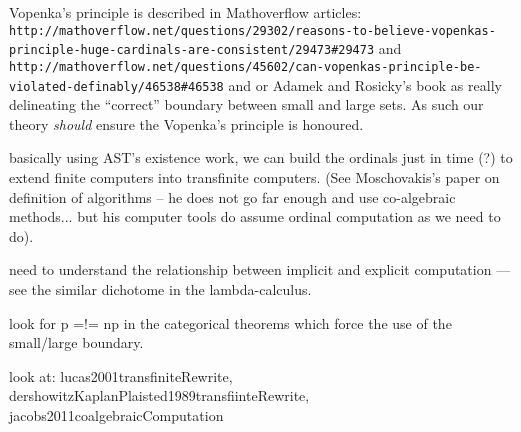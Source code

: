 \documentclass[a4paper,openany]{amsbook}
\begin{document}
Vopenka's principle is described in Mathoverflow articles:
\verb|http://mathoverflow.net/questions/29302/reasons-to-believe-vopenkas-principle-huge-cardinals-are-consistent/29473#29473|
and
\verb|http://mathoverflow.net/questions/45602/can-vopenkas-principle-be-violated-definably/46538#46538|
and or Adamek and Rosicky's book as really delineating the ``correct'' boundary
between small and large sets. As such our theory \emph{should} ensure the
Vopenka's principle is honoured.

basically using AST's existence work, we can build the ordinals just in time (?)
to extend finite computers into transfinite computers. (See Moschovakis's paper
on definition of algorithms -- he does not go far enough and use co-algebraic
methods... but his computer tools do assume ordinal computation as we need to
do).

need to understand the relationship between implicit and explicit computation
--- see the similar dichotome in the lambda-calculus.

look for p =!= np in the categorical theorems which force the use of the
small/large boundary.

look at: lucas2001transfiniteRewrite,
dershowitzKaplanPlaisted1989transfiinteRewrite,
jacobs2011coalgebraicComputation



\end{document}
